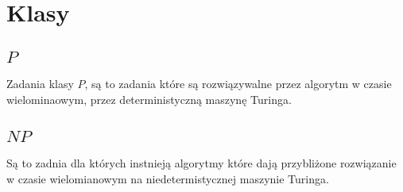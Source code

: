 \documentclass[11pt]{article}
\begin{document}
\section{Klasy}
\label{sec:orgf686947}
\subsection{\(P\)}
\label{sec:org5bf8710}
Zadania klasy \(P\), są to zadania które są rozwiązywalne przez algorytm w czasie wielominaowym, przez deterministyczną maszynę Turinga.

\subsection{\(NP\)}
\label{sec:orga09eb9a}
Są to zadnia dla których instnieją algorytmy które dają przybliżone rozwiązanie w czasie wielomianowym na niedetermistycznej maszynie Turinga.
\end{document}
